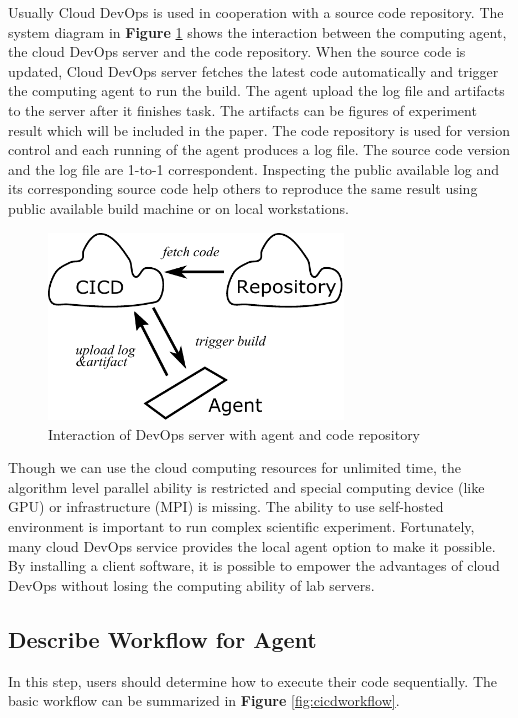 \documentclass{IEEEcsmag}
\begin{document}
Usually Cloud DevOps is used in cooperation with a source code repository. The system diagram in \textbf{Figure} \ref{fig:principal} shows the interaction between the computing agent, the cloud DevOps server and the code repository. When the source code is updated, Cloud DevOps server fetches the latest code automatically and trigger the computing agent to run the build. The agent upload the log file and artifacts to the server after it finishes task. The artifacts can be figures of experiment result which will be included in the paper. 
The code repository is used for version control and each running of the agent produces a log file. The source code version and the log file are 1-to-1 correspondent. Inspecting the public available log and its corresponding source code help others to reproduce the same result using public available build machine or on local workstations.

\begin{figure}[!ht]
\centerline{\includegraphics[width=18.5pc]{principal.pdf}}
\caption{Interaction of DevOps server with agent and code repository}\label{fig:principal}
\end{figure}

Though we can use the cloud computing resources for unlimited time, the algorithm level parallel ability is restricted and special computing device (like GPU) or infrastructure (MPI) is missing. The ability to use self-hosted environment is important to run complex scientific experiment. Fortunately, many cloud DevOps service provides the local agent option to make it possible. By installing a client software, it is possible to empower the advantages of cloud DevOps without losing the computing ability of lab servers. 
\subsection{Describe Workflow for Agent}
In this step, users should determine how to execute their code sequentially. The basic workflow can be summarized in \textbf{Figure} \ref{fig:cicdworkflow}.
\end{document}
